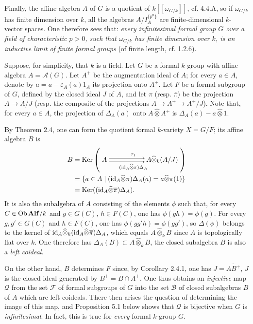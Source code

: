 Finally, the affine algebra $A$ of $G$ is a quotient of $k[[\omega_{G/k}]]$, cf. 4.4.A, so if $\omega_{G/k}$ has finite dimension over $k$, all the algebras $A/I_A^{\{p^n\}}$ are finite-dimensional $k$-vector spaces. One therefore sees that: \emph{every infinitesimal formal group $G$ over a field of characteristic $p>0$, such that $\omega_{G/k}$ has finite dimension over $k$, is an inductive limit of finite formal groups} (\ie of finite length, cf. 1.2.6).

Suppose, for simplicity, that $k$ is a field. Let $G$ be a formal $k$-group with affine algebra $A=\mathscr A(G)$. Let $A^+$ be the augmentation ideal of $A$; for every $a\in A$, denote by $\overline a=a-\varepsilon_A(a)1_A$ its projection onto $A^+$. Let $F$ be a formal subgroup of $G$, defined by the closed ideal $J$ of $A$, and let $\pi$ (resp. $\overline\pi$) be the projection $A\to A/J$ (resp. the composite of the projections $A\to A^+\to A^+/J$). Note that, for every $a\in A$, the projection of $\Delta_A(a)$ onto $A\widehat\otimes A^+$ is $\Delta_A(a)-a\widehat\otimes1$.

By Theorem 2.4, one can form the quotient formal $k$-variety $X=G/F$; its affine algebra $B$ is
\[
\begin{aligned}
B&=\Ker\left(\xymatrix@C=52pt{A\ar@<.6ex>[r]^{\tau_1}\ar@<-.6ex>[r]_{(\id_A\widehat\otimes\pi)\Delta_A}&A\widehat\otimes_k(A/J)}\right)\\
&=\{a\in A\mid(\id_A\widehat\otimes\pi)\Delta_A(a)=a\widehat\otimes\pi(1)\}\\
&=\Ker((\id_A\widehat\otimes\overline\pi)\Delta_A).
\end{aligned}
\]
It is also the subalgebra of $A$ consisting of the elements $\phi$ such that, for every $C\in\operatorname{Ob}\mathbf{Alf}/k$ and $g\in G(C)$, $h\in F(C)$, one has $\phi(gh)=\phi(g)$. For every $g,g'\in G(C)$ and $h\in F(C)$, one has $\phi(gg'h)=\phi(gg')$, so $\Delta(\phi)$ belongs to the kernel of $\mathrm{id}_A\widehat\otimes_k(\mathrm{id}_A\widehat\otimes\overline\pi)\Delta_A$, which equals $A\widehat\otimes_k B$ since $A$ is topologically flat over $k$. One therefore has $\Delta_A(B)\subset A\widehat\otimes_k B$, \ie the closed subalgebra $B$ is also a \emph{left coideal}.

On the other hand, $B$ determines $F$ since, by Corollary 2.4.1, one has $J=\overline{AB^+}$, \ie $J$ is the closed ideal generated by $B^+=B\cap A^+$. One thus obtains an \emph{injective} map $\mathcal Q$ from the set $\mathscr F$ of formal subgroups of $G$ into the set $\mathscr B$ of closed subalgebras $B$ of $A$ which are left coideals. There then arises the question of determining the image of this map, and Proposition 5.1 below shows that $\mathcal Q$ is bijective when $G$ is \emph{infinitesimal}. In fact, this is true for \emph{every} formal $k$-group $G$.

